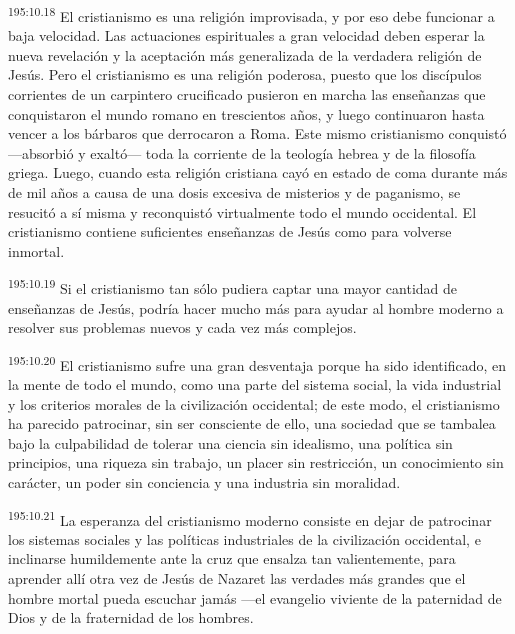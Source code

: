 \par 
\textsuperscript{195:10.18} El cristianismo es una religión improvisada, y por eso debe funcionar a baja velocidad. Las actuaciones espirituales a gran velocidad deben esperar la nueva revelación y la aceptación más generalizada de la verdadera religión de Jesús. Pero el cristianismo es una religión poderosa, puesto que los discípulos corrientes de un carpintero crucificado pusieron en marcha las enseñanzas que conquistaron el mundo romano en trescientos años, y luego continuaron hasta vencer a los bárbaros que derrocaron a Roma. Este mismo cristianismo conquistó ---absorbió y exaltó--- toda la corriente de la teología hebrea y de la filosofía griega. Luego, cuando esta religión cristiana cayó en estado de coma durante más de mil años a causa de una dosis excesiva de misterios y de paganismo, se resucitó a sí misma y reconquistó virtualmente todo el mundo occidental. El cristianismo contiene suficientes enseñanzas de Jesús como para volverse inmortal.

\par 
\textsuperscript{195:10.19} Si el cristianismo tan sólo pudiera captar una mayor cantidad de enseñanzas de Jesús, podría hacer mucho más para ayudar al hombre moderno a resolver sus problemas nuevos y cada vez más complejos.

\par 
\textsuperscript{195:10.20} El cristianismo sufre una gran desventaja porque ha sido identificado, en la mente de todo el mundo, como una parte del sistema social, la vida industrial y los criterios morales de la civilización occidental; de este modo, el cristianismo ha parecido patrocinar, sin ser consciente de ello, una sociedad que se tambalea bajo la culpabilidad de tolerar una ciencia sin idealismo, una política sin principios, una riqueza sin trabajo, un placer sin restricción, un conocimiento sin carácter, un poder sin conciencia y una industria sin moralidad.

\par 
\textsuperscript{195:10.21} La esperanza del cristianismo moderno consiste en dejar de patrocinar los sistemas sociales y las políticas industriales de la civilización occidental, e inclinarse humildemente ante la cruz que ensalza tan valientemente, para aprender allí otra vez de Jesús de Nazaret las verdades más grandes que el hombre mortal pueda escuchar jamás ---el evangelio viviente de la paternidad de Dios y de la fraternidad de los hombres.